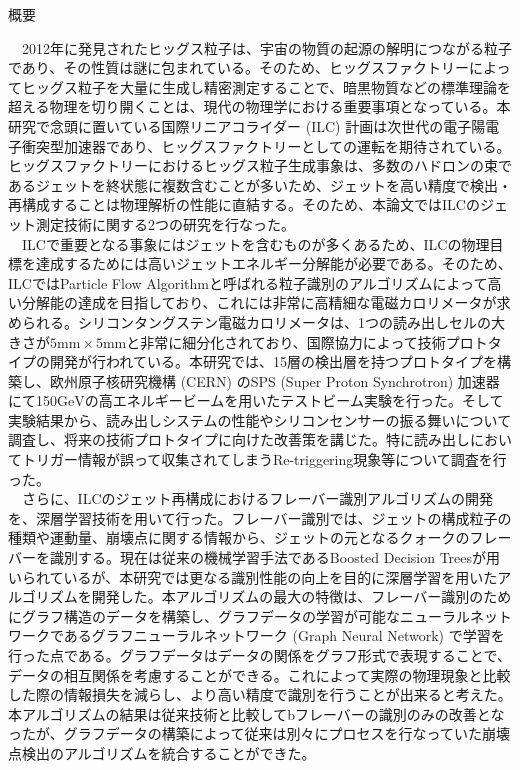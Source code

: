 
\ifabstract
 \maketitle
\fi
\begin{center}
{\LARGE 概要}\\
\end{center}
　2012年に発見されたヒッグス粒子は、宇宙の物質の起源の解明につながる粒子であり、その性質は謎に包まれている。そのため、ヒッグスファクトリーによってヒッグス粒子を大量に生成し精密測定することで、暗黒物質などの標準理論を超える物理を切り開くことは、現代の物理学における重要事項となっている。本研究で念頭に置いている国際リニアコライダー (ILC) 計画は次世代の電子陽電子衝突型加速器であり、ヒッグスファクトリーとしての運転を期待されている。ヒッグスファクトリーにおけるヒッグス粒子生成事象は、多数のハドロンの束であるジェットを終状態に複数含むことが多いため、ジェットを高い精度で検出・再構成することは物理解析の性能に直結する。そのため、本論文ではILCのジェット測定技術に関する2つの研究を行なった。\\
　ILCで重要となる事象にはジェットを含むものが多くあるため、ILCの物理目標を達成するためには高いジェットエネルギー分解能が必要である。そのため、ILCではParticle Flow Algorithmと呼ばれる粒子識別のアルゴリズムによって高い分解能の達成を目指しており、これには非常に高精細な電磁カロリメータが求められる。シリコンタングステン電磁カロリメータは、1つの読み出しセルの大きさが$5\mathrm{mm} \times 5\mathrm{mm}$と非常に細分化されており、国際協力によって技術プロトタイプの開発が行われている。本研究では、15層の検出層を持つプロトタイプを構築し、欧州原子核研究機構 (CERN) のSPS (Super Proton Synchrotron) 加速器にて150$\mathrm{GeV}$の高エネルギービームを用いたテストビーム実験を行った。そして実験結果から、読み出しシステムの性能やシリコンセンサーの振る舞いについて調査し、将来の技術プロトタイプに向けた改善策を講じた。特に読み出しにおいてトリガー情報が誤って収集されてしまうRe-triggering現象等について調査を行った。\\
　さらに、ILCのジェット再構成におけるフレーバー識別アルゴリズムの開発を、深層学習技術を用いて行った。フレーバー識別では、ジェットの構成粒子の種類や運動量、崩壊点に関する情報から、ジェットの元となるクォークのフレーバーを識別する。現在は従来の機械学習手法であるBoosted Decision Treesが用いられているが、本研究では更なる識別性能の向上を目的に深層学習を用いたアルゴリズムを開発した。本アルゴリズムの最大の特徴は、フレーバー識別のためにグラフ構造のデータを構築し、グラフデータの学習が可能なニューラルネットワークであるグラフニューラルネットワーク (Graph Neural Network) で学習を行った点である。グラフデータはデータの関係をグラフ形式で表現することで、データの相互関係を考慮することができる。これによって実際の物理現象と比較した際の情報損失を減らし、より高い精度で識別を行うことが出来ると考えた。本アルゴリズムの結果は従来技術と比較してbフレーバーの識別のみの改善となったが、グラフデータの構築によって従来は別々にプロセスを行なっていた崩壊点検出のアルゴリズムを統合することができた。%
